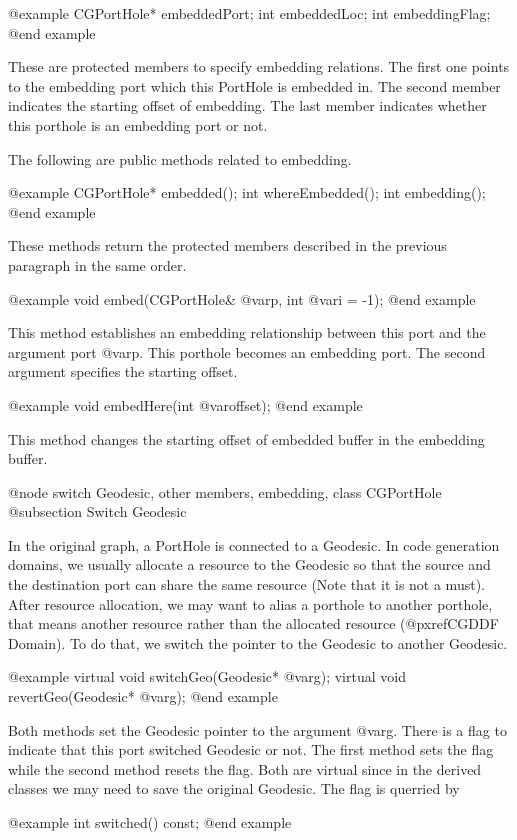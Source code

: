 @example
CGPortHole* embeddedPort;
int embeddedLoc;
int embeddingFlag;
@end example

These are protected members to specify embedding relations. The first one
points to the embedding port which this PortHole is embedded in. The second
member indicates the starting offset of embedding. The last member indicates
whether this porthole is an embedding port or not.

The following are public methods related to embedding.

@example
CGPortHole* embedded();
int whereEmbedded();
int embedding();
@end example

These methods return the protected members described in the previous
paragraph in the same order.

@example
void embed(CGPortHole& @var{p}, int @var{i} = -1);
@end example

This method establishes an embedding relationship between this port and
the argument port @var{p}. This porthole becomes an embedding port.
The second argument specifies the starting offset.

@example
void embedHere(int @var{offset});
@end example

This method changes the starting offset of embedded buffer in the embedding
buffer.

@node switch Geodesic, other members, embedding, class CGPortHole
@subsection Switch Geodesic

In the original graph, a PortHole is connected to a Geodesic. In code
generation domains, we usually allocate a resource to the Geodesic so that
the source and the destination port can share the same resource (Note that
it is not a must). After resource allocation, we may want to alias
a porthole to another porthole, that means another resource rather than
the allocated resource (@pxref{CGDDF Domain}). To do that, we switch
the pointer to the Geodesic to another Geodesic.

@example
virtual void switchGeo(Geodesic* @var{g});
virtual void revertGeo(Geodesic* @var{g});
@end example

Both methods set the Geodesic pointer to the argument @var{g}. There is a flag
to indicate that this port switched Geodesic or not. The first method
sets the flag while the second method resets the flag. Both are virtual since
in the derived classes we may need to save the original Geodesic.
The flag is querried by

@example
int switched() const;
@end example

